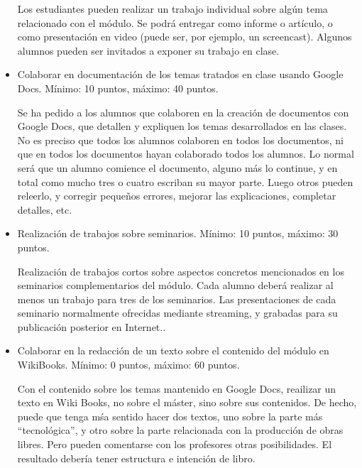 \documentclass[a4paper,12pt]{article}
\begin{document}
\begin{itemize}
Los estudiantes pueden realizar un trabajo individual sobre algún tema relacionado con el módulo. Se podrá entregar como informe o artículo, o como presentación en video (puede ser, por ejemplo, un screencast). Algunos alumnos pueden ser invitados a exponer su trabajo en clase.


\item Colaborar en documentación de los temas tratados en clase usando Google Docs. Mínimo: 10 puntos, máximo: 40 puntos.

Se ha pedido a los alumnos que colaboren en la creación de documentos con Google Docs, que detallen y expliquen los temas desarrollados en las clases. No es preciso que todos los alumnos colaboren en todos los documentos, ni que en todos los documentos hayan colaborado todos los alumnos. Lo normal será que un alumno comience el documento, alguno más lo continue, y en total como mucho tres o cuatro escriban su mayor parte. Luego otros pueden releerlo, y corregir pequeños errores, mejorar las explicaciones, completar detalles, etc.

\item Realización de trabajos sobre seminarios. Mínimo: 10 puntos, máximo: 30 puntos.

Realización de trabajos cortos sobre aspectos concretos mencionados en los seminarios complementarios del módulo. Cada alumno deberá realizar al menos un trabajo para tres de los seminarios. Las presentaciones de cada seminario normalmente ofrecidas mediante streaming, y grabadas para su publicación posterior en Internet..

\item Colaborar en la redacción de un texto sobre el contenido del módulo en WikiBooks. Mínimo: 0 puntos, máximo: 60 puntos.

Con el contenido sobre los temas mantenido en Google Docs, reailizar un texto en Wiki Books, no sobre el máster, sino sobre sus contenidos. De hecho, puede que tenga mśa sentido hacer dos textos, uno sobre la parte más ``tecnológica'', y otro sobre la parte relacionada con la producción de obras libres. Pero pueden comentarse con los profesores otras posibilidades. El resultado debería tener estructura e intención de libro.

\end{itemize}

\end{document}
